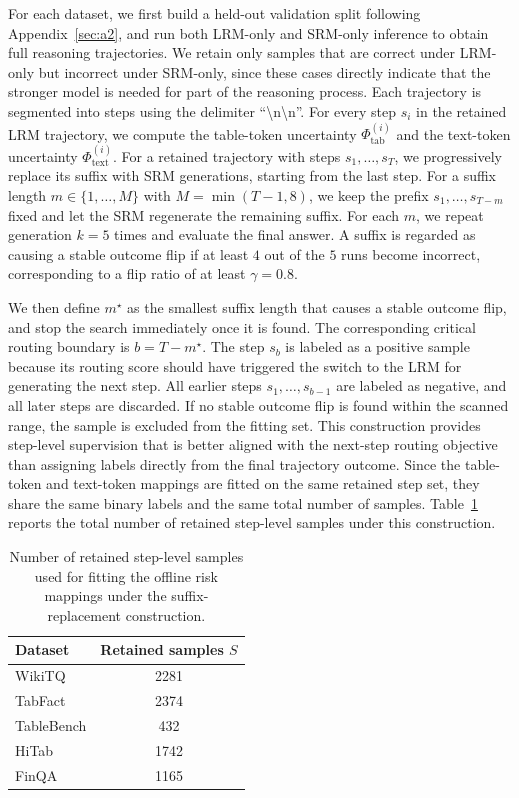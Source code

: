 \documentclass[11pt]{article}
\begin{document}
For each dataset, we first build a held-out validation split following Appendix~\ref{sec:a2}, and run both LRM-only and SRM-only inference to obtain full reasoning trajectories. We retain only samples that are correct under LRM-only but incorrect under SRM-only, since these cases directly indicate that the stronger model is needed for part of the reasoning process. Each trajectory is segmented into steps using the delimiter ``\textbackslash n\textbackslash n''. For every step $s_i$ in the retained LRM trajectory, we compute the table-token uncertainty $\Phi_{\text{tab}}^{(i)}$ and the text-token uncertainty $\Phi_{\text{text}}^{(i)}$.
For a retained trajectory with steps $s_1,\dots,s_T$, we progressively replace its suffix with SRM generations, starting from the last step. For a suffix length $m \in \{1,\dots,M\}$ with $M=\min(T-1,8)$, we keep the prefix $s_1,\dots,s_{T-m}$ fixed and let the SRM regenerate the remaining suffix. For each $m$, we repeat generation $k=5$ times and evaluate the final answer. A suffix is regarded as causing a stable outcome flip if at least $4$ out of the $5$ runs become incorrect, corresponding to a flip ratio of at least $\gamma=0.8$.

We then define $m^\star$ as the smallest suffix length that causes a stable outcome flip, and stop the search immediately once it is found. The corresponding critical routing boundary is $b=T-m^\star$. The step $s_b$ is labeled as a positive sample because its routing score should have triggered the switch to the LRM for generating the next step. All earlier steps $s_1,\dots,s_{b-1}$ are labeled as negative, and all later steps are discarded. If no stable outcome flip is found within the scanned range, the sample is excluded from the fitting set.
This construction provides step-level supervision that is better aligned with the next-step routing objective than assigning labels directly from the final trajectory outcome. Since the table-token and text-token mappings are fitted on the same retained step set, they share the same binary labels and the same total number of samples. Table~\ref{tab:risk-data-size} reports the total number of retained step-level samples under this construction.

\begin{table}[t]
\centering
\small
\begin{tabular}{lc}
\toprule
Dataset & Retained samples $S$ \\
\midrule
WikiTQ & 2281 \\
TabFact & 2374 \\
TableBench & 432 \\
HiTab & 1742 \\
FinQA & 1165 \\
\bottomrule
\end{tabular}
\caption{Number of retained step-level samples used for fitting the offline risk mappings under the suffix-replacement construction.}
\label{tab:risk-data-size}
\vspace{-14pt}
\end{table}
\end{document}
